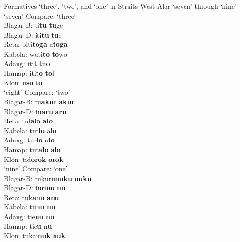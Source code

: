 \let\eachwordone=\rm
\let\eachwordtwo=\it
\let\eachwordthree=\it
\let\eachwordfour=\it
\let\eachwordfive=\it
\let\eachwordsix=\it
\let\eachwordseven=\it
\let\eachwordeight=\it

\newpage
\ea%
\upshape Formatives `three', `two', and `one' in Straits-West-Alor `seven' through `nine' 
\label{ex:6:8} 
\ea 
\gllllllll {} 	`seven'	 Compare:	 `three'\\
{\rm Blagar-B:}	 {ti}\textbf{{tu}} {}	 \textbf{{tu}}{ge}\\
{\rm Blagar-D:}	 {{\texthtb}}{iti}\textbf{{tu}}	 {}	 \textbf{{tu}}{e}	 \\
{\rm Reta:}	 	{biti}\textbf{{toga}}\textbf{}	 {}	 {a}\textbf{{toga}}	 \\
{\rm Kabola:}	 	{wuti}\textbf{{to}}	 {}	 \textbf{{to}}{wo}\textbf{}	 \\
{\rm Adang:}	 	{iti}\textbf{{t}}{{\textopeno}}	 {}	 \textbf{{t}}{u}\textbf{{o}}\\
{\rm Hamap:}	 	{iti}\textbf{{to}}	 {}	 \textbf{{to}}{f}\\
{\rm Klon:}	 	{u}\textbf{{so{\ng}}} {}		 \textbf{{to{\ng}}}\textbf{}	 \\
\ex	 
\gllllllll {}		`eight'	 Compare:	 `two'\\
{\rm Blagar-B:}	 {tu}\textbf{{akur}}	 {}	 \textbf{{akur}}\\
{\rm Blagar-D:}	 {tu}\textbf{{aru}}	 {}	 \textbf{{aru}}	 \\
{\rm Reta:}		{tul}\textbf{{alo}} {}		 \textbf{{alo}}	 \\
{\rm Kabola:}	 	{tur}\textbf{{lo}}	 {}	 {a}\textbf{{lo}}\textbf{}	 \\
{\rm Adang:}		 {tur}\textbf{{lo}}	 {}	 {a}\textbf{{lo}}\\
{\rm Hamap:}	 	{tur}\textbf{{alo}}	 {}	 \textbf{{alo}}\\
{\rm Klon:}	 	{tid}\textbf{{orok}} {}		 \textbf{{orok}}\textbf{}	 \\
\ex	 
\gllllllll {}	`nine'	 Compare:	 `one'\\
{\rm Blagar-B:}	 {tukuru}\textbf{{nuku}} {}		 \textbf{{nuku}}	 \\
{\rm Blagar-D:}	 {turi}\textbf{{nu}}	 {}	 \textbf{{nu}}	 \\
{\rm Reta:}	 	{tuk}\textbf{{anu}}	 {}	 \textbf{{anu}}\\
{\rm Kabola:}	 	{ti}{{\textglotstop}i}\textbf{{nu}} {}		 \textbf{{nu}}\textbf{}	 \\
{\rm Adang:}	 	{ti}{{\textglotstop}e}\textbf{{nu}} {}		 \textbf{{nu}}\textbf{}	 \\
{\rm Hamap:}		 {tie}\textbf{{u}}	 {}	 {n}\textbf{{u}}\textbf{}	 \\
{\rm Klon:}	 	{tukai}\textbf{{nuk}}	 {}	 \textbf{{nuk}}\\
\z
\z


